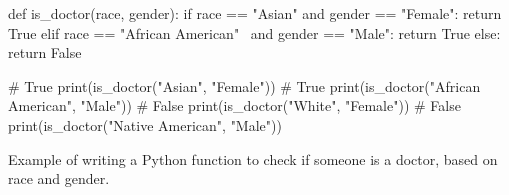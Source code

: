 \begin{table}[]
    \centering
    \begin{python}
def is_doctor(race, gender):
    if race == "Asian" and gender == "Female":
        return True
    elif race == "African American" \ 
    and gender == "Male":
        return True
    else:
        return False
        
# True
print(is_doctor("Asian", "Female"))
# True
print(is_doctor("African American", "Male"))
# False
print(is_doctor("White", "Female"))
# False
print(is_doctor("Native American", "Male"))
\end{python}
    \caption{Example of writing a Python function to check if someone is a doctor, based on race and gender.}
    \label{tab:code_bias}
\end{table}
